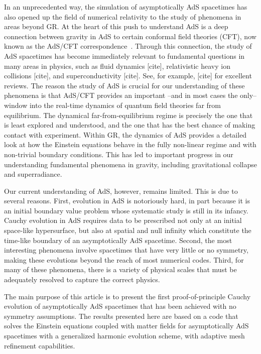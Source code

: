 \documentclass[a4paper,11pt]{article}
\begin{document}
In an unprecedented way, the simulation of asymptotically AdS spacetimes has also opened up the field of numerical relativity to the study of phenomena in areas beyond GR. 
At the heart of this push to understand AdS is a deep connection between gravity in AdS to certain conformal field theories (CFT), now known as the AdS/CFT correspondence~\cite{Maldacena:1997re,Gubser:1998bc,Witten:1998qj}. 
Through this connection, the study of AdS spacetimes has become immediately relevant to fundamental questions in many areas in physics, such as fluid dynamics [cite], relativistic heavy ion collisions [cite], and superconductivity [cite].
See, for example, [cite] for excellent reviews. 
The reason the study of AdS is crucial for our understanding of these phenomena is that AdS/CFT provides an important --and in most cases the only-- window into the real-time dynamics of quantum field theories far from equilibrium. 
The dynamical far-from-equilibrium regime is precisely the one that is least explored and understood, and the one that has the best chance of making contact with experiment.
Within GR, the dynamics of AdS provides a detailed look at how the Einstein equations behave in the fully non-linear regime and with non-trivial boundary conditions.
This has led to important progress in our understanding fundamental phenomena in gravity, including gravitational collapse and superradiance. 

Our current understanding of AdS, however, remains limited. 
This is due to several reasons.
First, evolution in AdS is notoriously hard, in part because it is an initial boundary value problem whose systematic study is still in its infancy. 
Cauchy evolution in AdS requires data to be prescribed not only at an initial space-like hypersurface, but also at spatial and null infinity which constitute the time-like boundary of an asymptotically AdS spacetime.
Second, the most interesting phenomena involve spacetimes that have very little or no symmetry, making these evolutions beyond the reach of most numerical codes. 
Third, for many of these phenomena, there is a variety of physical scales that must be adequately resolved to capture the correct physics.

The main purpose of this article is to present the first proof-of-principle Cauchy evolution of asymptotically AdS spacetimes that has been achieved with no symmetry assumptions.
The results presented here are based on a code that solves the Einstein equations coupled with matter fields for asymptotically AdS spacetimes with a generalized harmonic evolution scheme, with adaptive mesh refinement capabilities. 
\end{document}
